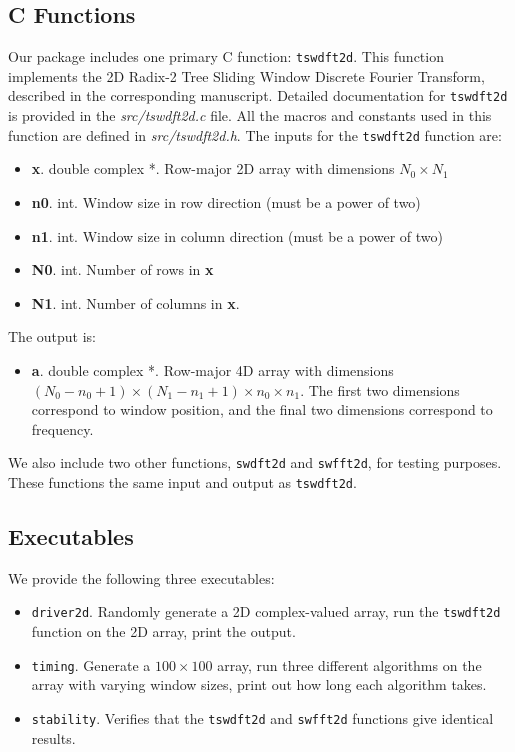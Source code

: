 \documentclass[11pt]{article}
\theoremstyle{definition}
\begin{document}
\subsection{C Functions}
Our package includes one primary C function: {\tt tswdft2d}. This function implements the 2D Radix-2 Tree Sliding Window Discrete Fourier Transform, described in the corresponding manuscript. Detailed documentation for {\tt tswdft2d} is provided in the {\it src/tswdft2d.c} file. All the macros and constants used in this function are defined in {\it src/tswdft2d.h}. The inputs for the {\tt tswdft2d} function are:

\begin{itemize}
	\item {\bf x}. double complex *. Row-major 2D array with dimensions $N_0 \times N_1$
	\item {\bf n0}. int. Window size in row direction (must be a power of two)
	\item {\bf n1}. int. Window size in column direction (must be a power of two)
	\item {\bf N0}. int. Number of rows in {\bf x}
	\item {\bf N1}. int. Number of columns in {\bf x}.
\end{itemize}

The output is:

\begin{itemize}
	\item {\bf a}. double complex *. Row-major 4D array with dimensions $(N_0 - n_0 + 1) \times (N_1 - n_1 + 1) \times n_0 \times n_1$. The first two dimensions correspond to window position, and the final two dimensions correspond to frequency. 
\end{itemize}

We also include two other functions, {\tt swdft2d} and {\tt swfft2d}, for testing purposes. These functions the same input and output as {\tt tswdft2d}. 

\subsection{Executables}
We provide the following three executables:

\begin{itemize}
	\item {\tt driver2d}. Randomly generate a 2D complex-valued array, run the {\tt tswdft2d} function on the 2D array, print the output. 
	\item {\tt timing}. Generate a $100 \times 100$ array, run three different algorithms on the array with varying window sizes, print out how long each algorithm takes. 
	\item {\tt stability}. Verifies that the {\tt tswdft2d} and {\tt swfft2d} functions give identical results. 
\end{itemize}
\end{document}
